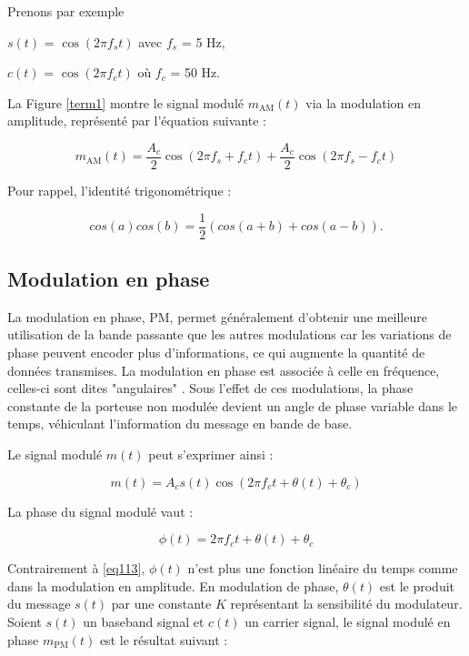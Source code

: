Prenons par exemple 

$s(t)$ = $\cos(2\pi f_{s}t)$ avec $f_{s}$ = 5 Hz,

$c(t)$ = $\cos(2\pi f_{c}t)$ où $f_{c}$ = 50 Hz.

La Figure \ref{term1} montre le signal modulé $m_\mathrm{AM}(t)$ via la modulation en amplitude, représenté par l'équation suivante :

\begin{equation}\label{eq1140}
m_\mathrm{AM}(t) = \frac{A_c}{2} \cos(2\pi f_s + f_c t) + \frac{A_c}{2} \cos(2\pi f_s - f_c t)
\end{equation}

Pour rappel, l'identité trigonométrique :

\begin{equation}\label{eq114}
cos(a)cos(b) = \frac{1}{2} (cos(a+b) + cos(a-b)).
\end{equation}



\subsection{Modulation en phase}

La modulation en phase, \ac{PM}, permet généralement d'obtenir une meilleure utilisation de la bande passante que les autres modulations car les variations de phase peuvent encoder plus d'informations, ce qui augmente la quantité de données transmises. La modulation en phase est associée à celle en fréquence, celles-ci sont dites "angulaires" \cite{angle}. Sous l’effet de ces modulations, la phase constante de la porteuse non modulée devient un angle de phase variable dans le temps, véhiculant l’information du message en bande de base.

Le signal modulé $m(t)$ peut s'exprimer ainsi :

\begin{equation}\label{eq1200}
m(t) = A_c s(t) \cos(2 \pi f_c t + \theta(t) + \theta_c)
\end{equation}

La phase du signal modulé vaut :

\begin{equation}\label{eq1201}
\phi (t) = 2 \pi f_c t +\theta(t) + \theta_c 
\end{equation}

Contrairement à \ref{eq113}, $\phi(t)$ n'est plus une fonction linéaire du temps comme dans la modulation en amplitude. En modulation de phase, $\theta(t)$ est le produit du message $s(t)$ par une constante $K$ représentant la sensibilité du modulateur.
Soient $s(t)$ un baseband signal et $c(t)$ un carrier signal, le signal modulé en phase $m_\mathrm{PM}(t)$ est le résultat suivant :

